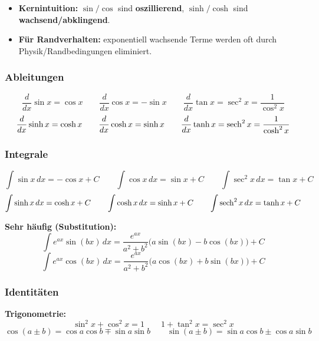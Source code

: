 \documentclass[a4paper]{article}
\newcommand{\imp}[1]{{\color{accent}\bfseries #1}}
\begin{document}
\begin{checkitem}
\begin{itemize}
  \item \imp{Kernintuition:} $\sin/\cos$ sind \textbf{oszillierend}, $\sinh/\cosh$ sind \textbf{wachsend/abklingend}.
  \item \imp{Für Randverhalten:} exponentiell wachsende Terme werden oft durch Physik/Randbedingungen eliminiert.
\end{itemize}
\end{checkitem}

\subsubsection{Ableitungen}
\begin{schema}
\[
\frac{d}{dx}\sin x = \cos x
\qquad
\frac{d}{dx}\cos x = -\sin x
\qquad
\frac{d}{dx}\tan x = \sec^2 x = \frac{1}{\cos^2 x}
\]
\[
\frac{d}{dx}\sinh x = \cosh x
\qquad
\frac{d}{dx}\cosh x = \sinh x
\qquad
\frac{d}{dx}\tanh x = \sech^2 x = \frac{1}{\cosh^2 x}
\]
\end{schema}

\subsubsection{Integrale }
\begin{schema}
\[
\int \sin x\,dx = -\cos x + C
\qquad
\int \cos x\,dx = \sin x + C
\qquad
\int \sec^2 x\,dx = \tan x + C
\]
\[
\int \sinh x\,dx = \cosh x + C
\qquad
\int \cosh x\,dx = \sinh x + C
\qquad
\int \sech^2 x\,dx = \tanh x + C
\]
\end{schema}

\begin{schema}
\imp{Sehr häufig (Substitution):}
\[
\int e^{ax}\sin(bx)\,dx
=
\frac{e^{ax}}{a^2+b^2}\big(a\sin(bx)-b\cos(bx)\big)+C
\]
\[
\int e^{ax}\cos(bx)\,dx
=
\frac{e^{ax}}{a^2+b^2}\big(a\cos(bx)+b\sin(bx)\big)+C
\]
\end{schema}

\subsubsection{Identitäten }
\begin{schema}
\imp{Trigonometrie:}
\[
\sin^2 x+\cos^2 x = 1
\qquad
1+\tan^2 x = \sec^2 x
\]
\[
\cos(a\pm b)=\cos a\cos b \mp \sin a\sin b
\qquad
\sin(a\pm b)=\sin a\cos b \pm \cos a\sin b
\]
\end{schema}
\end{document}
